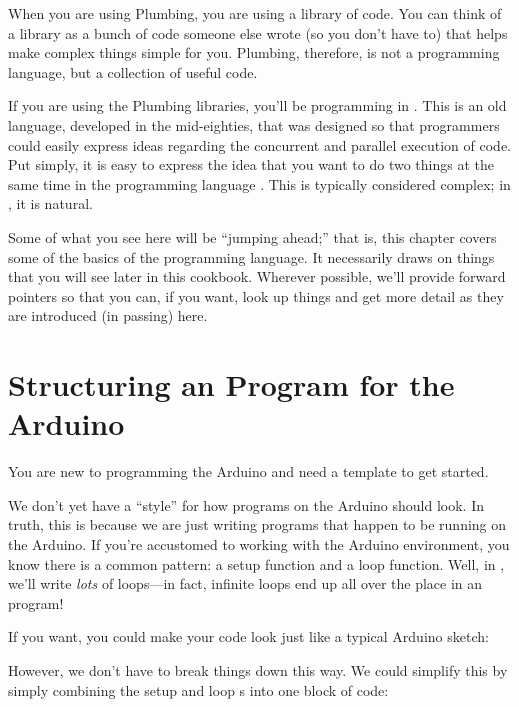 When you are using Plumbing, you are using a library of code. You can think of a library as a bunch of code someone else wrote (so you don't have to) that helps make complex things simple for you. Plumbing, therefore, is not a programming language, but a collection of useful code.

If you are using the Plumbing libraries, you'll be programming in \occam. This is an old language, developed in the mid-eighties, that was designed so that programmers could easily express ideas regarding the concurrent and parallel execution of code. Put simply, it is easy to express the idea that you want to do two things at the same time in the programming language \occam. This is typically considered complex; in \occam, it is natural.

Some of what you see here will be ``jumping ahead;'' that is, this chapter covers some of the basics of the \occam programming language. It necessarily draws on things that you will see later in this cookbook. Wherever possible, we'll provide forward pointers so that you can, if you want, look up things and get more detail as they are introduced (in passing) here. 

% 
\section{Structuring an \occam Program for the Arduino}

\problem
You are new to programming the Arduino and need a template to get started.

\solution
We don't yet have a ``style'' for how \occam programs on the Arduino should look. In truth, this is because we are just writing \occam programs that happen to be running on the Arduino. If you're accustomed to working with the Arduino environment, you know there is a common pattern: a {\code setup} function and a {\code loop} function. Well, in \occam, we'll write \emph{lots} of loops---in fact, infinite loops end up all over the place in an \occam program!

If you want, you could make your code look just like a typical Arduino sketch:



However, we don't have to break things down this way. We could simplify this by simply combining the {\code setup} and {\code loop} {\PROC}s into one block of code:

